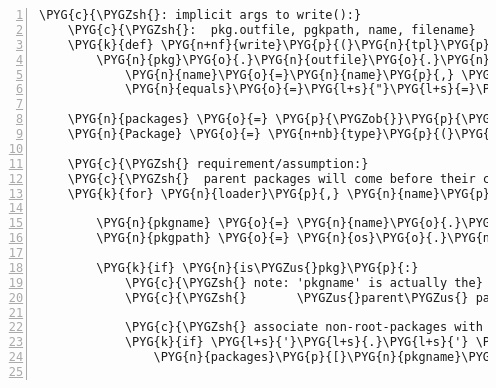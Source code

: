 \begin{Verbatim}[commandchars=\\\{\},numbers=left,firstnumber=1,stepnumber=5]
    \PYG{c}{\PYGZsh{}: implicit args to write():}
    \PYG{c}{\PYGZsh{}:  pkg.outfile, pgkpath, name, filename}
    \PYG{k}{def} \PYG{n+nf}{write}\PYG{p}{(}\PYG{n}{tpl}\PYG{p}{,} \PYG{o}{*}\PYG{o}{*}\PYG{n}{kwargs}\PYG{p}{)}\PYG{p}{:}
        \PYG{n}{pkg}\PYG{o}{.}\PYG{n}{outfile}\PYG{o}{.}\PYG{n}{write}\PYG{p}{(}\PYG{n}{tpl}\PYG{o}{.}\PYG{n}{format}\PYG{p}{(}
            \PYG{n}{name}\PYG{o}{=}\PYG{n}{name}\PYG{p}{,} \PYG{n}{path}\PYG{o}{=}\PYG{n}{pkgpath} \PYG{o}{+} \PYG{n}{os}\PYG{o}{.}\PYG{n}{sep} \PYG{o}{+} \PYG{n}{filename}\PYG{p}{,}
            \PYG{n}{equals}\PYG{o}{=}\PYG{l+s}{"}\PYG{l+s}{=}\PYG{l+s}{"} \PYG{o}{*} \PYG{n+nb}{len}\PYG{p}{(}\PYG{n}{name}\PYG{p}{)}\PYG{p}{,} \PYG{n}{dashes}\PYG{o}{=}\PYG{l+s}{"}\PYG{l+s}{-}\PYG{l+s}{"} \PYG{o}{*} \PYG{n+nb}{len}\PYG{p}{(}\PYG{n}{name}\PYG{p}{)}\PYG{p}{,} \PYG{o}{*}\PYG{o}{*}\PYG{n}{kwargs}\PYG{p}{)}\PYG{p}{)}

    \PYG{n}{packages} \PYG{o}{=} \PYG{p}{\PYGZob{}}\PYG{p}{\PYGZcb{}}
    \PYG{n}{Package} \PYG{o}{=} \PYG{n+nb}{type}\PYG{p}{(}\PYG{l+s}{'}\PYG{l+s}{'}\PYG{p}{,} \PYG{p}{(}\PYG{p}{)}\PYG{p}{,} \PYG{p}{\PYGZob{}}\PYG{p}{\PYGZcb{}}\PYG{p}{)}

    \PYG{c}{\PYGZsh{} requirement/assumption:}
    \PYG{c}{\PYGZsh{}  parent packages will come before their children}
    \PYG{k}{for} \PYG{n}{loader}\PYG{p}{,} \PYG{n}{name}\PYG{p}{,} \PYG{n}{is\PYGZus{}pkg} \PYG{o+ow}{in} \PYG{n}{walk\PYGZus{}packages}\PYG{p}{(}\PYG{n}{opts}\PYG{p}{[}\PYG{l+s}{'}\PYG{l+s}{\textless{}path\textgreater{}}\PYG{l+s}{'}\PYG{p}{]}\PYG{p}{)}\PYG{p}{:}

        \PYG{n}{pkgname} \PYG{o}{=} \PYG{n}{name}\PYG{o}{.}\PYG{n}{rsplit}\PYG{p}{(}\PYG{l+s}{'}\PYG{l+s}{.}\PYG{l+s}{'}\PYG{p}{,} \PYG{l+m+mi}{1}\PYG{p}{)}\PYG{p}{[}\PYG{l+m+mi}{0}\PYG{p}{]}
        \PYG{n}{pkgpath} \PYG{o}{=} \PYG{n}{os}\PYG{o}{.}\PYG{n}{path}\PYG{o}{.}\PYG{n}{relpath}\PYG{p}{(}\PYG{n}{loader}\PYG{o}{.}\PYG{n}{path}\PYG{p}{,} \PYG{l+s}{"}\PYG{l+s}{.}\PYG{l+s}{"}\PYG{p}{)}

        \PYG{k}{if} \PYG{n}{is\PYGZus{}pkg}\PYG{p}{:}
            \PYG{c}{\PYGZsh{} note: 'pkgname' is actually the}
            \PYG{c}{\PYGZsh{}       \PYGZus{}parent\PYGZus{} package name in this case}

            \PYG{c}{\PYGZsh{} associate non-root-packages with their parents}
            \PYG{k}{if} \PYG{l+s}{'}\PYG{l+s}{.}\PYG{l+s}{'} \PYG{o+ow}{in} \PYG{n}{name}\PYG{p}{:}
                \PYG{n}{packages}\PYG{p}{[}\PYG{n}{pkgname}\PYG{p}{]}\PYG{o}{.}\PYG{n}{subpackages}\PYG{o}{.}\PYG{n}{append}\PYG{p}{(}\PYG{n}{name}\PYG{p}{)}


\end{Verbatim}
